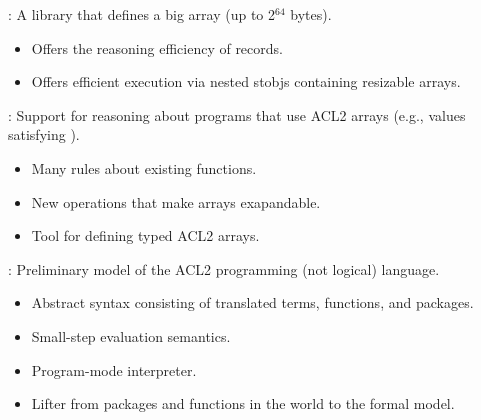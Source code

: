 


\begin{frame}[fragile]

\newlibtitle

:
A library that defines a big array (up to 2$^{64}$ bytes).
\begin{itemize}
\item Offers the reasoning efficiency of records.
\item Offers efficient execution via nested stobjs containing resizable arrays.
\end{itemize}

\end{frame}


\begin{frame}

\newlibtitle

:
Support for reasoning about programs that use ACL2 arrays (e.g.,
values satisfying ).

\begin{itemize}
\item Many rules about existing functions.
\item New operations that make arrays exapandable.
\item Tool for defining typed ACL2 arrays.
\end{itemize}

\end{frame}


\begin{frame}[fragile]

\newlibtitle

:
Preliminary model of the ACL2 programming (not logical) language.
\begin{itemize}
\item Abstract syntax consisting of translated terms, functions, and packages.
\item Small-step evaluation semantics.
\item Program-mode interpreter.
\item Lifter from packages and functions in the world to the formal model.
\end{itemize}

\end{frame}

